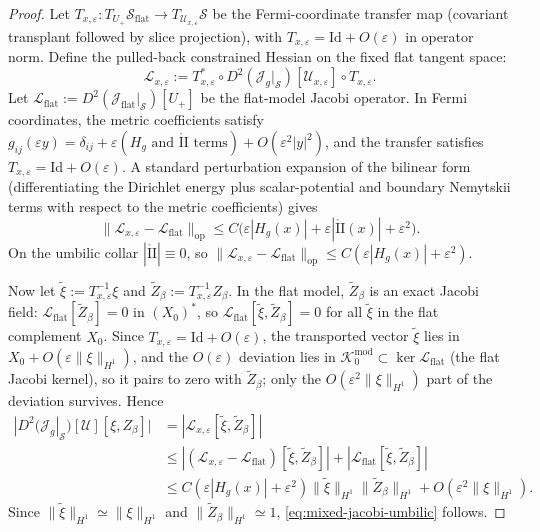 \documentclass[11pt,reqno,a4paper]{amsart}
\numberwithin{equation}{section}
\theoremstyle{plain}
\theoremstyle{remark}
\theoremstyle{plain}
\begin{document}
\begin{proof}
Let $T_{x,\varepsilon}:T_{U_+}\mathcal S_{\mathrm{flat}}\to T_{\mathcal U_{x,\varepsilon}}\mathcal S$
be the Fermi-coordinate transfer map (covariant transplant followed by slice projection),
with $T_{x,\varepsilon}=\mathrm{Id}+O(\varepsilon)$ in operator norm.
Define the pulled-back constrained Hessian on the fixed flat tangent space:
\[
\mathcal L_{x,\varepsilon}
:=T_{x,\varepsilon}^*\circ D^2(\mathcal J_g|_{\mathcal S})[\mathcal U_{x,\varepsilon}]\circ T_{x,\varepsilon}.
\]
Let $\mathcal L_{\mathrm{flat}}:=D^2(\mathcal J_{\mathrm{flat}}|_{\mathcal S})[U_+]$
be the flat-model Jacobi operator.
In Fermi coordinates, the metric coefficients satisfy
$g_{ij}(\varepsilon y)=\delta_{ij}+\varepsilon(H_g\text{ and }\mathring{\mathrm{II}}\text{ terms})
+O(\varepsilon^2|y|^2)$,
and the transfer satisfies $T_{x,\varepsilon}=\mathrm{Id}+O(\varepsilon)$.
A standard perturbation expansion of the bilinear form
(differentiating the Dirichlet energy plus scalar-potential and boundary Nemytskii terms
with respect to the metric coefficients) gives
\[
\|\mathcal L_{x,\varepsilon}-\mathcal L_{\mathrm{flat}}\|_{\mathrm{op}}
\le C\bigl(\varepsilon|H_g(x)|+\varepsilon|\mathring{\mathrm{II}}(x)|+\varepsilon^2\bigr).
\]
On the umbilic collar $|\mathring{\mathrm{II}}|\equiv0$, so
$\|\mathcal L_{x,\varepsilon}-\mathcal L_{\mathrm{flat}}\|_{\mathrm{op}}
\le C(\varepsilon|H_g(x)|+\varepsilon^2)$.

Now let $\tilde\xi:=T_{x,\varepsilon}^{-1}\xi$ and $\tilde Z_\beta:=T_{x,\varepsilon}^{-1}Z_\beta$.
In the flat model, $\tilde Z_\beta$ is an exact Jacobi field:
$\mathcal L_{\mathrm{flat}}[\tilde Z_\beta]=0$ in $(X_0)^*$,
so $\mathcal L_{\mathrm{flat}}[\tilde\xi,\tilde Z_\beta]=0$
for all $\tilde\xi$ in the flat complement $X_0$.
Since $T_{x,\varepsilon}=\mathrm{Id}+O(\varepsilon)$, the transported vector
$\tilde\xi$ lies in $X_0+O(\varepsilon\|\xi\|_{H^1})$, and the $O(\varepsilon)$ deviation
lies in $\mathcal K_0^{\mathrm{mod}}\subset\ker\mathcal L_{\mathrm{flat}}$
(the flat Jacobi kernel), so it pairs to zero with $\tilde Z_\beta$;
only the $O(\varepsilon^2\|\xi\|_{H^1})$ part of the deviation survives.
Hence
\begin{align*}
|D^2(\mathcal J_g|_{\mathcal S})[\mathcal U][\xi,Z_\beta]|
&=|\mathcal L_{x,\varepsilon}[\tilde\xi,\tilde Z_\beta]|\\
&\le|(\mathcal L_{x,\varepsilon}-\mathcal L_{\mathrm{flat}})[\tilde\xi,\tilde Z_\beta]|
+|\mathcal L_{\mathrm{flat}}[\tilde\xi,\tilde Z_\beta]|\\
&\le C(\varepsilon|H_g(x)|+\varepsilon^2)\|\tilde\xi\|_{H^1}\|\tilde Z_\beta\|_{H^1}
+O(\varepsilon^2\|\xi\|_{H^1}).
\end{align*}
Since $\|\tilde\xi\|_{H^1}\simeq\|\xi\|_{H^1}$ and $\|\tilde Z_\beta\|_{H^1}\simeq1$,
\eqref{eq:mixed-jacobi-umbilic} follows.
\end{proof}
\end{document}
